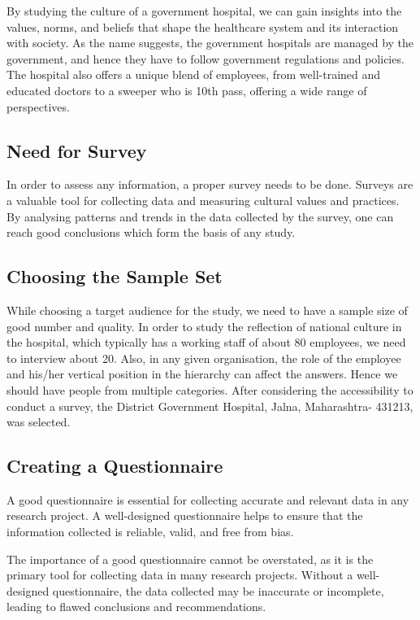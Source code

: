 \documentclass[12pt]{article}
\begin{document}
By studying the culture of a government hospital, we can gain insights into the values, norms, and beliefs that shape the healthcare system and its interaction with society. As the name suggests, the government hospitals are managed by the government, and hence they have to follow government regulations and policies\cite{ref: IPCH}. The hospital also offers a unique blend of employees, from well-trained and educated doctors to a sweeper who is 10th pass, offering a wide range of perspectives.

\subsection{Need for Survey}

In order to assess any information, a proper survey needs to be done. Surveys are a valuable tool for collecting data and measuring cultural values and practices. By analysing patterns and trends in the data collected by the survey, one can reach good conclusions which form the basis of any study.

\subsection{Choosing the Sample Set}

While choosing a target audience for the study, we need to have a sample size of good number and quality. In order to study the reflection of national culture in the hospital, which typically has a working staff of about 80 employees, we need to interview about 20. Also, in any given organisation, the role of the employee and his/her vertical position in the hierarchy can affect the answers. Hence we should have people from multiple categories. After considering the accessibility to conduct a survey, the District Government Hospital, Jalna, Maharashtra- 431213, was selected.

\subsection{Creating a Questionnaire}

A good questionnaire is essential for collecting accurate and relevant data in any research project. A well-designed questionnaire helps to ensure that the information collected is reliable, valid, and free from bias.

The importance of a good questionnaire cannot be overstated, as it is the primary tool for collecting data in many research projects. Without a well-designed questionnaire, the data collected may be inaccurate or incomplete, leading to flawed conclusions and recommendations.
\end{document}
